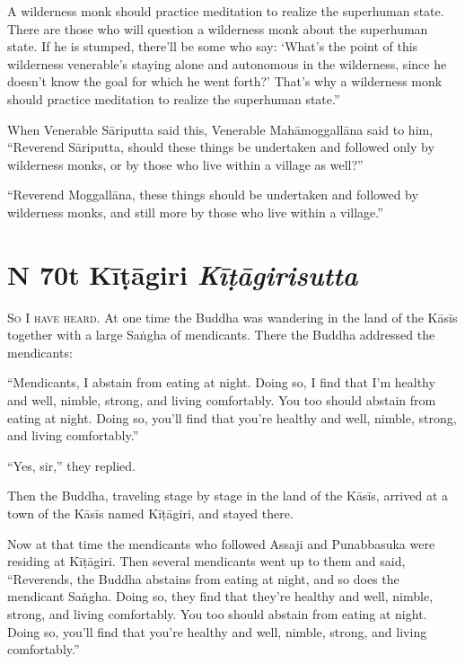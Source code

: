 \documentclass[12pt,openany]{book}%
\newcommand*{\suttatitleacronym}[1]{\smaller[2]{#1}\vspace*{.3em}}
\newcommand*{\suttatitletranslation}[1]{\linebreak{#1}}
\newcommand*{\suttatitleroot}[1]{\linebreak\smaller[2]\itshape{#1}}
\newcommand*{\tocacronym}[1]{\hspace*{-3.3em}{#1}\quad}
\newcommand*{\toctranslation}[1]{#1}
\newcommand*{\tocroot}[1]{(\textit{#1})}
\newcommand*{\scevam}[1]{\textsc{#1}}
\begin{document}
A wilderness monk should practice meditation to realize the superhuman state. There are those who will question a wilderness monk about the superhuman state. If he is stumped, there’ll be some who say: ‘What’s the point of this wilderness venerable’s staying alone and autonomous in the wilderness, since he doesn’t know the goal for which he went forth?’ That’s why a wilderness monk should practice meditation to realize the superhuman state.” 

When Venerable \textsanskrit{Sāriputta} said this, Venerable \textsanskrit{Mahāmoggallāna} said to him, “Reverend \textsanskrit{Sāriputta}, should these things be undertaken and followed only by wilderness monks, or by those who live within a village as well?” 

“Reverend \textsanskrit{Moggallāna}, these things should be undertaken and followed by wilderness monks, and still more by those who live within a village.” 

%
\section*{{\suttatitleacronym MN 70}{\suttatitletranslation At Kīṭāgiri }{\suttatitleroot Kīṭāgirisutta}}
\addcontentsline{toc}{section}{\tocacronym{MN 70} \toctranslation{At Kīṭāgiri } \tocroot{Kīṭāgirisutta}}

\scevam{So I have heard. }At one time the Buddha was wandering in the land of the \textsanskrit{Kāsīs} together with a large \textsanskrit{Saṅgha} of mendicants. There the Buddha addressed the mendicants: 

“Mendicants, I abstain from eating at night. Doing so, I find that I’m healthy and well, nimble, strong, and living comfortably. You too should abstain from eating at night. Doing so, you’ll find that you’re healthy and well, nimble, strong, and living comfortably.” 

“Yes, sir,” they replied. 

Then the Buddha, traveling stage by stage in the land of the \textsanskrit{Kāsīs}, arrived at a town of the \textsanskrit{Kāsīs} named \textsanskrit{Kīṭāgiri}, and stayed there. 

Now at that time the mendicants who followed Assaji and Punabbasuka were residing at \textsanskrit{Kīṭāgiri}. Then several mendicants went up to them and said, “Reverends, the Buddha abstains from eating at night, and so does the mendicant \textsanskrit{Saṅgha}. Doing so, they find that they’re healthy and well, nimble, strong, and living comfortably. You too should abstain from eating at night. Doing so, you’ll find that you’re healthy and well, nimble, strong, and living comfortably.” 
\end{document}
